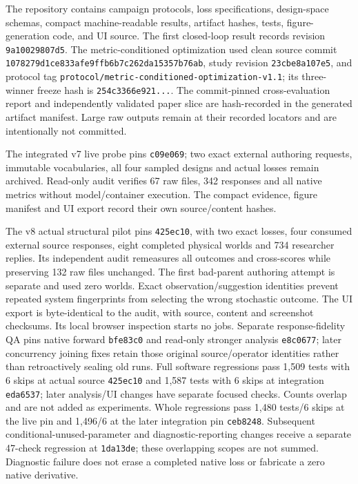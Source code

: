 \documentclass{article}
\newcommand{\code}[1]{\texttt{#1}}
\begin{document}
The repository contains campaign protocols, loss specifications, design-space schemas, compact machine-readable results, artifact hashes, tests, figure-generation code, and UI source. The first closed-loop result records revision \code{9a10029807d5}. The metric-conditioned optimization used clean source commit \code{1078279d1ce833afe9ffb6b7c262da15357b76ab}, study revision \code{23cbe8a107e5}, and protocol tag \code{protocol/metric-conditioned-optimization-v1.1}; its three-winner freeze hash is \code{254c3366e921...}. The commit-pinned cross-evaluation report and independently validated paper slice are hash-recorded in the generated artifact manifest. Large raw outputs remain at their recorded locators and are intentionally not committed.

The integrated v7 live probe pins \code{c09e069}; two exact external authoring
requests, immutable vocabularies, all four sampled designs and actual losses
remain archived. Read-only audit verifies 67 raw files, 342 responses and all
native metrics without model/container execution. The compact evidence,
figure manifest and UI export record their own source/content hashes.

The v8 actual structural pilot pins \code{425ec10}, with two exact losses,
four consumed external source responses, eight completed physical worlds and
734 researcher replies. Its independent audit remeasures all outcomes and
cross-scores while preserving 132 raw files unchanged. The first bad-parent
authoring attempt is separate and used zero worlds. Exact observation/suggestion
identities prevent repeated system fingerprints from selecting the wrong
stochastic outcome. The UI export is byte-identical to the audit, with source,
content and screenshot checksums. Its local browser inspection starts no jobs.
Separate response-fidelity QA pins native forward \code{bfe83c0} and read-only
stronger analysis \code{e8c0677}; later concurrency joining fixes retain those
original source/operator identities rather than retroactively sealing old runs.
Full software regressions pass 1,509 tests with 6 skips at actual source \code{425ec10} and
1,587 tests with 6 skips at integration \code{eda6537}; later analysis/UI changes have
separate focused checks. Counts overlap and are not added as experiments.
Whole regressions pass 1,480 tests/6 skips at the live pin and 1,496/6 at the later
integration pin \code{ceb8248}. Subsequent conditional-unused-parameter and
diagnostic-reporting changes receive a separate 47-check regression at
\code{1da13de}; these overlapping scopes are not summed. Diagnostic failure
does not erase a completed native loss or fabricate a zero native derivative.
\end{document}
